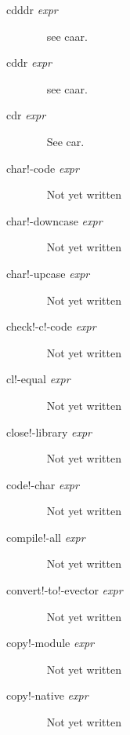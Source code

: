 \documentclass[a4paper,11pt]{article}
\begin{document}
\begin{description}
\item[{\ttfamily cdddr} {\itshape expr}] ~\newline
see {\ttfamily caar}.

\item[{\ttfamily cddr} {\itshape expr}] ~\newline
see {\ttfamily caar}.

\item [{\ttfamily cdr} {\itshape expr}] ~\newline
See {\ttfamily car}.

\item [{\ttfamily char!-code} {\itshape  expr}] ~\newline
Not yet written

\item [{\ttfamily char!-downcase} {\itshape  expr}] ~\newline
Not yet written

\item [{\ttfamily char!-upcase} {\itshape  expr}] ~\newline
Not yet written

\item [{\ttfamily check!-c!-code} {\itshape  expr}] ~\newline
Not yet written

\item [{\ttfamily cl!-equal} {\itshape  expr}] ~\newline
Not yet written

\item [{\ttfamily close!-library} {\itshape  expr}] ~\newline
Not yet written

\item [{\ttfamily code!-char} {\itshape  expr}] ~\newline
Not yet written

\item [{\ttfamily compile!-all} {\itshape  expr}] ~\newline
Not yet written

\item [{\ttfamily convert!-to!-evector} {\itshape  expr}] ~\newline
Not yet written

\item [{\ttfamily copy!-module} {\itshape  expr}] ~\newline
Not yet written

\item [{\ttfamily copy!-native} {\itshape  expr}] ~\newline
Not yet written


\end{description}
\end{document}
